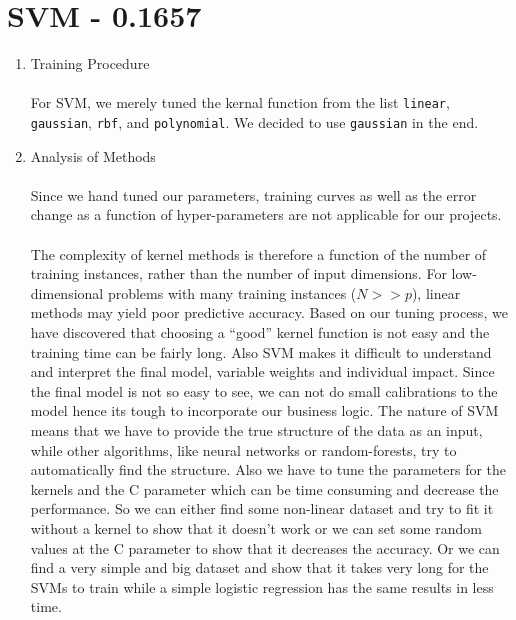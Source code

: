 \documentclass[english]{article}
\begin{document}
\section{SVM - 0.1657}
\begin{enumerate}
\item Training Procedure\\\\
For SVM, we merely tuned the kernal function from the list \texttt{linear}, \texttt{gaussian}, \texttt{rbf}, and \texttt{polynomial}. We decided to use \texttt{gaussian} in the end.\\
\item Analysis of Methods\\\\
Since we hand tuned our parameters, training curves as well as the error change as a function of hyper-parameters are not applicable for our projects.\\\\
The complexity of kernel methods is therefore a function of the number of training instances, rather than the number of input dimensions. For low-dimensional problems with many training instances ($N >> p$), linear methods may yield poor predictive accuracy. Based on our tuning process, we have discovered that choosing a “good” kernel function is not easy and the training time can be fairly long. Also SVM makes it difficult to understand and interpret the final model, variable weights and individual impact. Since the final model is not so easy to see, we can not do small calibrations to the model hence its tough to incorporate our business logic. The nature of SVM means that we have to provide the true structure of the data as an input, while other algorithms, like neural networks or random-forests, try to automatically find the structure. Also we have to tune the parameters for the kernels and the C parameter which can be time consuming and decrease the performance. So we can either find some non-linear dataset and try to fit it without a kernel to show that it doesn't work or we can set some random values at the C parameter to show that it decreases the accuracy. Or we can find a very simple and big dataset and show that it takes very long for the SVMs to train while a simple logistic regression has the same results in less time.
\end{enumerate}
\end{document}
